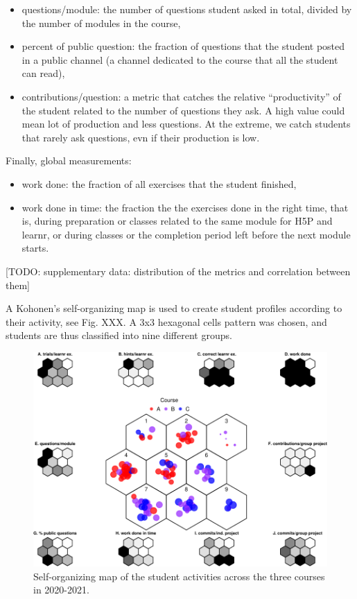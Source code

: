\documentclass[
]{article}
\providecommand{\tightlist}{%
  \setlength{\itemsep}{0pt}\setlength{\parskip}{0pt}}
\begin{document}
\begin{itemize}
\tightlist
\item
  questions/module: the number of questions student asked in total,
  divided by the number of modules in the course,
\item
  percent of public question: the fraction of questions that the student
  posted in a public channel (a channel dedicated to the course that all
  the student can read),
\item
  contributions/question: a metric that catches the relative
  ``productivity'' of the student related to the number of questions
  they ask. A high value could mean lot of production and less
  questions. At the extreme, we catch students that rarely ask
  questions, evn if their production is low.
\end{itemize}

Finally, global measurements:

\begin{itemize}
\tightlist
\item
  work done: the fraction of all exercises that the student finished,
\item
  work done in time: the fraction the the exercises done in the right
  time, that is, during preparation or classes related to the same
  module for H5P and learnr, or during classes or the completion period
  left before the next module starts.
\end{itemize}

{[}TODO: supplementary data: distribution of the metrics and correlation
between them{]}

A Kohonen's self-organizing map is used to create student profiles
according to their activity, see Fig. XXX. A 3x3 hexagonal cells pattern
was chosen, and students are thus classified into nine different groups.

\begin{figure}
\centering
\includegraphics{teaching_data_science_files/figure-latex/som-1.pdf}
\caption{Self-organizing map of the student activities across the three
courses in 2020-2021.}
\end{figure}
\end{document}
